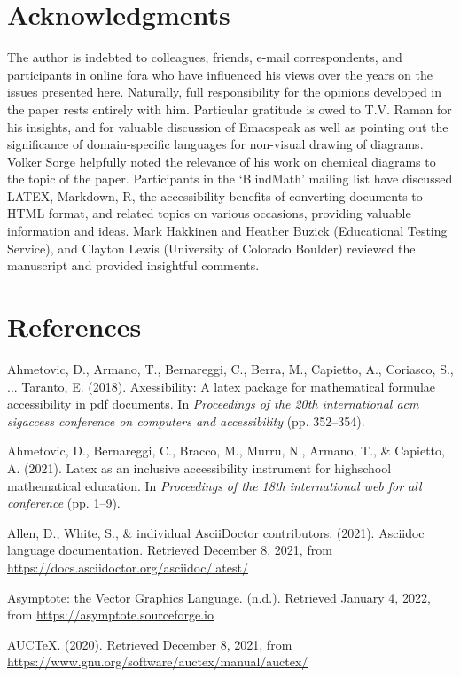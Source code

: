 \documentclass[11pt]{sig-alternate}
\begin{document}
\begin{large}
\section*{Acknowledgments}
The author is indebted to colleagues, friends, e-mail correspondents, and participants in online fora who have influenced his views over the years on the issues presented here. Naturally, full responsibility for the opinions developed in the paper rests entirely with him. Particular gratitude is owed to T.V. Raman for his insights, and for valuable discussion of Emacspeak as well as pointing out the significance of domain-specific languages for non-visual drawing of diagrams. Volker Sorge helpfully noted the relevance of his work on chemical diagrams to the topic of the paper. Participants in the ‘BlindMath’ mailing list have discussed LATEX, Markdown, R, the accessibility benefits of converting documents to HTML format, and related topics on various occasions, providing valuable information and ideas. Mark Hakkinen and Heather Buzick (Educational Testing Service), and Clayton Lewis (University of Colorado Boulder) reviewed the manuscript and provided insightful comments.


 
\section*{References}\par 

\leftskip 0.25in
\parindent -0.25in 
Ahmetovic, D., Armano, T., Bernareggi, C., Berra, M., Capietto, A., Coriasco, S., ... Taranto, E. (2018). Axessibility: A latex package for mathematical formulae accessibility in pdf documents. In \textit{Proceedings of the 20th international acm sigaccess conference on computers and accessibility }(pp. 352–354).

Ahmetovic, D., Bernareggi, C., Bracco, M., Murru, N., Armano, T., \& Capietto, A. (2021). Latex as an inclusive accessibility instrument for highschool mathematical education. In \textit{Proceedings of the 18th international web for all conference }(pp. 1–9).

Allen, D., White, S., \& individual AsciiDoctor contributors. (2021). Asciidoc language documentation. Retrieved December 8, 2021, from \url{https://docs.asciidoctor.org/asciidoc/latest/}

Asymptote: the Vector Graphics Language. (n.d.). Retrieved January 4, 2022, from \url{https://asymptote.sourceforge.io}

AUCTeX. (2020). Retrieved December 8, 2021, from \url{https://www.gnu.org/software/auctex/manual/auctex/}


\end{large}
\end{document}
